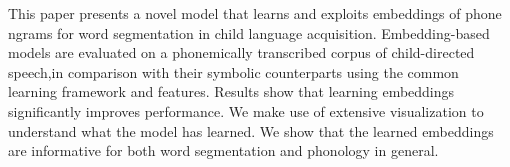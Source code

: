 This paper presents a novel model that learns and exploits embeddings of phone ngrams for word segmentation in child language acquisition. Embedding-based models are evaluated on a phonemically transcribed corpus of child-directed speech,in comparison with their symbolic counterparts using the common learning framework and features. Results show that learning embeddings significantly improves performance. We make use of extensive visualization to understand what the model has learned. We show that the learned embeddings are informative for both word segmentation and phonology in general.

